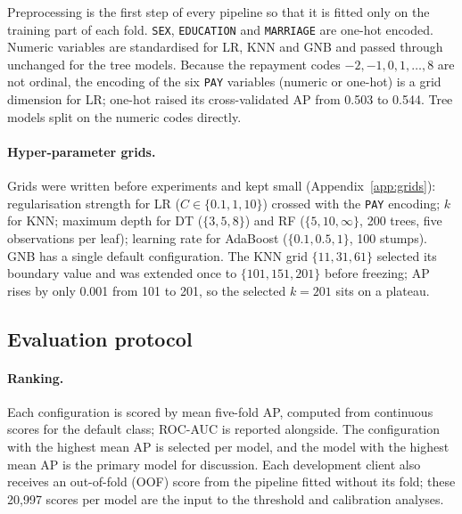 \documentclass{article}
\begin{document}
Preprocessing is the first step of every pipeline so that it is fitted only on the training part of each fold. \texttt{SEX}, \texttt{EDUCATION} and \texttt{MARRIAGE} are one-hot encoded. Numeric variables are standardised for LR, KNN and GNB and passed through unchanged for the tree models. Because the repayment codes $-2,-1,0,1,\dots,8$ are not ordinal, the encoding of the six \texttt{PAY} variables (numeric or one-hot) is a grid dimension for LR; one-hot raised its cross-validated AP from 0.503 to 0.544. Tree models split on the numeric codes directly.

\paragraph{Hyper-parameter grids.} Grids were written before experiments and kept small (Appendix~\ref{app:grids}): regularisation strength for LR ($C\in\{0.1,1,10\}$) crossed with the \texttt{PAY} encoding; $k$ for KNN; maximum depth for DT ($\{3,5,8\}$) and RF ($\{5,10,\infty\}$, 200 trees, five observations per leaf); learning rate for AdaBoost ($\{0.1,0.5,1\}$, 100 stumps). GNB has a single default configuration. The KNN grid $\{11,31,61\}$ selected its boundary value and was extended once to $\{101,151,201\}$ before freezing; AP rises by only 0.001 from 101 to 201, so the selected $k=201$ sits on a plateau.

\subsection{Evaluation protocol}
\paragraph{Ranking.} Each configuration is scored by mean five-fold AP, computed from continuous scores for the default class; ROC-AUC is reported alongside. The configuration with the highest mean AP is selected per model, and the model with the highest mean AP is the primary model for discussion. Each development client also receives an out-of-fold (OOF) score from the pipeline fitted without its fold; these 20{,}997 scores per model are the input to the threshold and calibration analyses.
\end{document}
